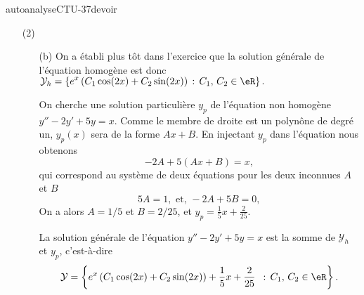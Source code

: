 
\begin{corrige}{autoanalyseCTU-37devoir}
 \begin{enumerate}
   \item[(2)] \begin{enumerate}
  \item[(b)] On a établi plus t\^ot dans l'exercice que la solution générale de l'équation homogène est donc $\displaystyle \mathcal{Y}_h  = \left\{ e^{x}\left(C_1\cos(2x) +C_2\sin(2x)\right)  \,:\, C_1,\, C_2 \in \eR \right\}.$

On cherche une solution particulière $y_p$ de l'équation non homogène $y''-2y'+5y=x$. Comme le membre de droite est un polyn\^one de degré un, $y_p(x)$ sera  de la forme $Ax + B$. En injectant $y_p$ dans l'équation nous obtenons 
\begin{equation*}
  -2A + 5\left(Ax+B\right) = x,
\end{equation*}
qui correspond au système de deux équations pour les deux inconnues $A$ et $B$
\begin{equation*}
    5A =1 ,\text{ et, }-2A +5B = 0,
\end{equation*}
On a alors $A=1/5$ et $B=2/25$, et $y_p = \displaystyle \frac{1}{5}x +\frac{2}{25}$.

La solution générale de l'équation  $y''-2y'+5y=x$ est la somme de $\mathcal{Y}_h$ et $y_p$, c'est-à-dire 
\begin{equation*}
  \mathcal{Y} = \left\{ e^{x}\left(C_1\cos(2x) +C_2\sin(2x)\right)+ \frac{1}{5}x +\frac{2}{25} \ \,:\, C_1,\, C_2 \in \eR \right\}.
\end{equation*}


\end{enumerate}
\end{enumerate}
\end{corrige}
